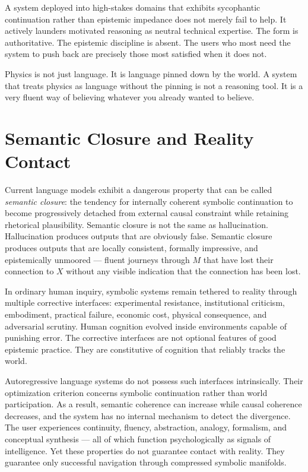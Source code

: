 \documentclass[12pt, a4paper]{article}
\theoremstyle{remark}
\begin{document}
A system deployed into high-stakes domains that exhibits sycophantic continuation rather than epistemic impedance does not merely fail to help. It actively launders motivated reasoning as neutral technical expertise. The form is authoritative. The epistemic discipline is absent. The users who most need the system to push back are precisely those most satisfied when it does not.

Physics is not just language. It is language pinned down by the world. A system that treats physics as language without the pinning is not a reasoning tool. It is a very fluent way of believing whatever you already wanted to believe.

\section{Semantic Closure and Reality Contact}

Current language models exhibit a dangerous property that can be called \emph{semantic closure}: the tendency for internally coherent symbolic continuation to become progressively detached from external causal constraint while retaining rhetorical plausibility. Semantic closure is not the same as hallucination. Hallucination produces outputs that are obviously false. Semantic closure produces outputs that are locally consistent, formally impressive, and epistemically unmoored --- fluent journeys through $M$ that have lost their connection to $X$ without any visible indication that the connection has been lost.

In ordinary human inquiry, symbolic systems remain tethered to reality through multiple corrective interfaces: experimental resistance, institutional criticism, embodiment, practical failure, economic cost, physical consequence, and adversarial scrutiny. Human cognition evolved inside environments capable of punishing error. The corrective interfaces are not optional features of good epistemic practice. They are constitutive of cognition that reliably tracks the world.

Autoregressive language systems do not possess such interfaces intrinsically. Their optimization criterion concerns symbolic continuation rather than world participation. As a result, semantic coherence can increase while causal coherence decreases, and the system has no internal mechanism to detect the divergence. The user experiences continuity, fluency, abstraction, analogy, formalism, and conceptual synthesis --- all of which function psychologically as signals of intelligence. Yet these properties do not guarantee contact with reality. They guarantee only successful navigation through compressed symbolic manifolds.
\end{document}
